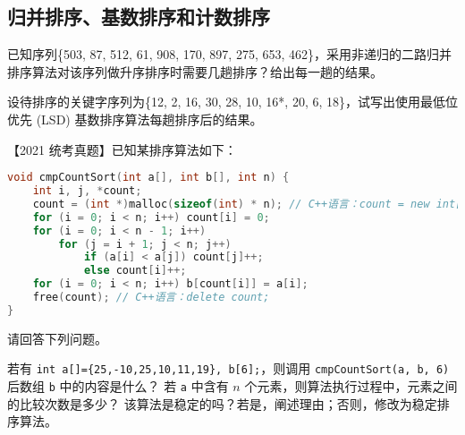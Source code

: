 \subsection{归并排序、基数排序和计数排序}

\begin{qitems}
    \begin{bbox}
        \qitem 已知序列\{503, 87, 512, 61, 908, 170, 897, 275, 653, 462\}，采用非递归的二路归并排序算法对该序列做升序排序时需要几趟排序？给出每一趟的结果。
    \end{bbox}
    \begin{bbox}
        \qitem 设待排序的关键字序列为\{12, 2, 16, 30, 28, 10, 16*, 20, 6, 18\}，试写出使用最低位优先 (LSD) 基数排序算法每趟排序后的结果。
    \end{bbox}
    \begin{bbox}
        \qitem 【2021 统考真题】已知某排序算法如下：
\begin{lstlisting}[language=C]
void cmpCountSort(int a[], int b[], int n) {
    int i, j, *count;
    count = (int *)malloc(sizeof(int) * n); // C++语言：count = new int[n];
    for (i = 0; i < n; i++) count[i] = 0;
    for (i = 0; i < n - 1; i++)
        for (j = i + 1; j < n; j++)
            if (a[i] < a[j]) count[j]++;
            else count[i]++;
    for (i = 0; i < n; i++) b[count[i]] = a[i];
    free(count); // C++语言：delete count;
}
\end{lstlisting}
        请回答下列问题。
        \begin{subqitems}
            \subqitem 若有 \lstinline|int a[]={25,-10,25,10,11,19}, b[6];|，则调用 \lstinline|cmpCountSort(a, b, 6)| 后数组 \lstinline|b| 中的内容是什么？
            \subqitem 若 \lstinline|a| 中含有 $n$ 个元素，则算法执行过程中，元素之间的比较次数是多少？
            \subqitem 该算法是稳定的吗？若是，阐述理由；否则，修改为稳定排序算法。
        \end{subqitems}
    \end{bbox}
\end{qitems} 